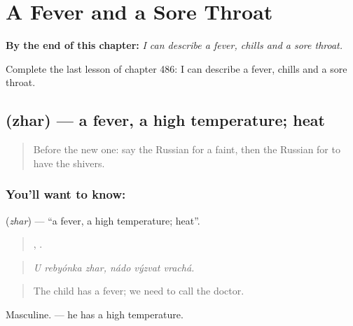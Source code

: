 
\chapter{A Fever and a Sore Throat}
\label{ch:ru-a-fever-and-a-sore-throat}

\begin{chapteropening}
\textbf{By the end of this chapter:} \emph{I can describe a fever, chills and a sore throat.}

Complete the last lesson of chapter 486: I can describe a fever, chills and a sore throat.
\end{chapteropening}

\section[\texorpdfstring{\ru{жар} (zhar)}{жар (zhar)}]{ (zhar) — a fever, a high temperature; heat}

\label{lesson:RU-C486-zhar}



\begin{quote}
Before the new one: say the Russian for a faint, then the Russian for to have the shivers.
\end{quote}

\subsection*{You'll want to know: }
\textbf{} (\emph{zhar}) — \textquotedblleft{}a fever, a high temperature; heat\textquotedblright{}.

\begin{quote}
  ,   .
\end{quote}

\begin{quote}
\emph{U rebyónka zhar, nádo výzvat vrachá.}
\end{quote}

\begin{quote}
The child has a fever; we need to call the doctor.
\end{quote}

Masculine. \emph{  } — he has a high temperature.

